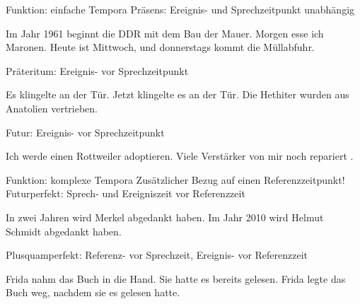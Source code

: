 \begin{frame}
  {Funktion: einfache Tempora}
  \pause
  \alert{Präsens: Ereignis- und Sprechzeitpunkt unabhängig}
  \pause
  \begin{exe}\ex\begin{xlist}
      \ex Im Jahr 1961 \alert{beginnt} die DDR mit dem Bau der Mauer.
      \pause
      \ex Morgen \alert{esse} ich Maronen.
      \pause
      \ex Heute \alert{ist} Mittwoch, und donnerstags \alert{kommt} die Müllabfuhr.
  \end{xlist}\end{exe}
  \pause
  \Halbzeile
  \alert{Präteritum: Ereignis- vor Sprechzeitpunkt}
  \pause
  \begin{exe}\ex\begin{xlist}
      \ex Es \alert{klingelte} an der Tür.
      \pause
    \ex Jetzt \alert{klingelte} es an der Tür.
      \pause
    \ex Die Hethiter \alert{wurden} aus Anatolien vertrieben.
  \end{xlist}\end{exe}
  \pause
  \Halbzeile
  \alert{Futur: Ereignis- vor Sprechzeitpunkt}
  \pause
  \begin{exe}\ex\begin{xlist}
      \ex Ich \alert{werde} einen Rottweiler \alert{adoptieren}.
      \pause
      \ex Viele Verstärker  von mir noch \alert{repariert} .
  \end{xlist}\end{exe}
\end{frame}

\begin{frame}
  {Funktion: komplexe Tempora}
  \pause
  Zusätzlicher Bezug auf einen Referenzzeitpunkt!\\
  \Zeile
  \pause
  \alert{Futurperfekt: Sprech- und Ereigniszeit vor Referenzzeit}
  \pause
  \begin{exe}
    \ex In zwei Jahren \alert{wird} Merkel \alert{abgedankt haben}.
    \pause
    \ex Im Jahr 2010 \alert{wird} Helmut Schmidt \alert{abgedankt haben}.
  \end{exe}
  \pause
  \Zeile
  \alert{Plusquamperfekt: Referenz- vor Sprechzeit, Ereignis- vor Referenzzeit}
  \pause
  \begin{exe}
    \ex Frida nahm das Buch in die Hand. Sie \alert{hatte} es bereits \alert{gelesen}.
      \pause
    \ex Frida legte das Buch weg, nachdem sie es \alert{gelesen hatte}.
  \end{exe}
\end{frame}

